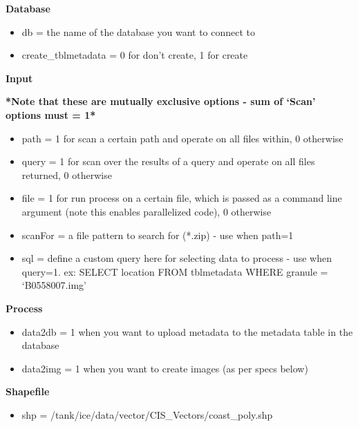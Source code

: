\documentclass[letterpaper,10pt,english]{sphinxmanual}
\begin{document}
\textbf{Database}
\begin{itemize}
\item {} 
db = the name of the database you want to connect to

\item {} 
create\_tblmetadata = 0 for don't create, 1 for create

\end{itemize}

\textbf{Input}

\textbf{*Note that these are mutually exclusive options - sum of `Scan'
options must = 1*}
\begin{itemize}
\item {} 
path = 1 for scan a certain path and operate on all files within, 0
otherwise

\item {} 
query = 1 for scan over the results of a query and operate on all
files returned, 0 otherwise

\item {} 
file = 1 for run process on a certain file, which is passed as a
command line argument (note this enables parallelized code), 0
otherwise

\item {} 
scanFor = a file pattern to search for (*.zip) - use when path=1

\item {} 
sql = define a custom query here for selecting data to process - use
when query=1. ex: SELECT location FROM tblmetadata WHERE granule =
`B0558007.img'

\end{itemize}

\textbf{Process}
\begin{itemize}
\item {} 
data2db = 1 when you want to upload metadata to the metadata table in
the database

\item {} 
data2img = 1 when you want to create images (as per specs below)

\end{itemize}

\textbf{Shapefile}
\begin{itemize}
\item {} 
shp = /tank/ice/data/vector/CIS\_Vectors/coast\_poly.shp

\end{itemize}
\end{document}
